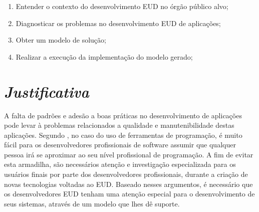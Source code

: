 \begin{enumerate}
	\item Entender o contexto do desenvolvimento EUD no órgão público alvo;
	\item Diagnosticar os problemas no desenvolvimento EUD de aplicações;
    \item Obter um modelo de solução;
    \item Realizar a execução da implementação do modelo gerado;
\end{enumerate}

\section{\textit{Justificativa}}

A falta de padrões e adesão a boas práticas no desenvolvimento de aplicações pode levar à problemas relacionados a qualidade e manutenibilidade destas aplicações. Segundo \cite{blackwell2003notational}, no caso do uso de ferramentas de programação, é muito fácil para os desenvolvedores profissionais de software assumir que qualquer pessoa irá se aproximar ao seu nível profissional de programação. A fim de evitar esta armadilha, são necessários atenção e investigação especializada para os usuários finais por parte dos desenvolvedores profissionais, durante a criação de novas tecnologias voltadas ao EUD. Baseado nesses argumentos, é necessário que os desenvolvedores EUD tenham uma atenção especial para o desenvolvimento de seus sistemas, através de um modelo que lhes dê suporte.

